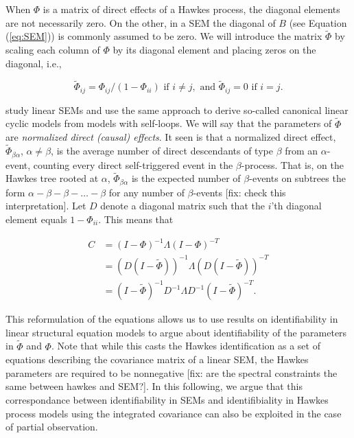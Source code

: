 \documentclass[accepted]{uai2021} %
\begin{document}
When $\Phi$ is a matrix of direct effects of a Hawkes process, the diagonal 
elements are not necessarily zero. On the other, in a SEM the diagonal of $B$ 
(see Equation (\ref{eq:SEM})) is commonly assumed to be zero. We will introduce 
the matrix $\tilde{\Phi}$ by scaling each column of $\Phi$ by its 
diagonal element and placing zeros on the diagonal, i.e.,

$$
\tilde{\Phi}_{ij} = \Phi_{ij}/(1-\Phi_{ii})  \text{ if } i\neq j, \text{ and } 
\tilde{\Phi}_{ij} 
= 0 \text{ if } i= j.
$$

\cite{hyttinen2012} study linear SEMs and use the same approach to derive 
so-called canonical linear 
cyclic models from models with self-loops. We 
will say that the parameters of $\tilde{\Phi}$ are \emph{normalized direct
(causal) effects}. It seen is that a normalized direct effect, 
$\tilde{\Phi}_{\beta\alpha}$, $\alpha\neq\beta$, is the average number of 
direct 
descendants of type 
$\beta$ from an $\alpha$-event, counting every direct self-triggered event in 
the $\beta$-process. 
That is, on the Hawkes tree rooted at $\alpha$, $\tilde{\Phi}_{\beta\alpha}$ is 
the expected number of $\beta$-events on subtrees the form $\alpha - \beta - 
\beta - \ldots - 
\beta$ for any number of $\beta$-events
[fix: check this interpretation]. 
Let $D$ denote a 
diagonal matrix such that the $i$'th diagonal element equals 
$1 - \Phi_{ii}$. This means that 

\begin{align*}
C & = (I - \Phi)^{-1}\Lambda (I - \Phi)^{-T}  \\
& = (D(I - \tilde{\Phi}))^{-1}\Lambda (D(I - \tilde{\Phi}))^{-T} \\
& = (I - \tilde{\Phi})^{-1}D^{-1} \Lambda D^{-1}(I - 
\tilde{\Phi})^{-T}.
\label{eq:Gtilde}
\end{align*}


This reformulation of the equations allows us to use results on identifiability 
in linear structural 
equation models to argue about 
identifiability of the parameters in $\tilde{\Phi}$ and $\Phi$. Note that while 
this 
casts the Hawkes identification as a set of equations describing the covariance 
matrix of a linear SEM, the Hawkes parameters are required to be nonnegative 
[fix: are the spectral constraints the same between hawkes and SEM?]. In this 
following, we argue that this correspondance between 
identifiability in SEMs and identifibiality in Hawkes process models using the 
integrated covariance can also be exploited in the case of partial observation.
\end{document}
